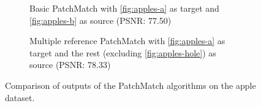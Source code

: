 \begin{figure}
\centering
\hfill
\begin{subfigure}{0.4\linewidth}
\caption{Basic PatchMatch with \ref{fig:apples-a} as target and \ref{fig:apples-b} as source (PSNR: 77.50)}
\label{fig:applesbasic}
\end{subfigure}
\hfill
\begin{subfigure}{0.4\linewidth}
\caption{Multiple reference PatchMatch with \ref{fig:apples-a} as target and the rest (excluding \ref{fig:apples-hole}) as source (PSNR: 78.33)}
\label{fig:applesrefs}
\end{subfigure}
\caption{Comparison of outputs of the PatchMatch algorithms on the apple dataset.}
\label{fig:applescompare}
\end{figure}

